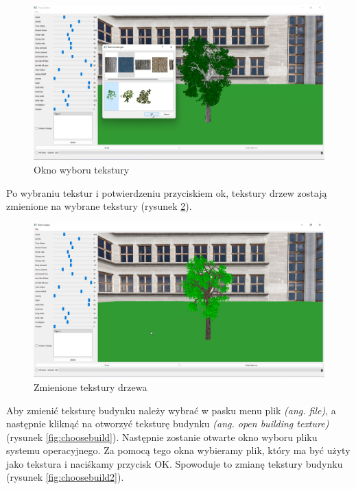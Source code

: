 \documentclass[a4paper,twoside,12pt]{report}
\begin{document}
\begin{figure}[H]
	\centering\includegraphics[width=15.5cm]{grafika/program/texture2.png}
	\caption{Okno wyboru tekstury}
    \label{fig:texchoosewin}
\end{figure}

Po wybraniu tekstur i potwierdzeniu przyciskiem ok, 
tekstury drzew zostają zmienione na wybrane 
tekstury (rysunek \ref{fig:texchoosewin2}).

\begin{figure}[H]
	\centering\includegraphics[width=15.5cm]{grafika/program/texture3.png}
	\caption{Zmienione tekstury drzewa}
    \label{fig:texchoosewin2}
\end{figure}

Aby zmienić teksturę budynku należy wybrać w pasku menu plik 
\textit{(ang. file)}, a następnie kliknąć na otworzyć 
teksturę budynku \textit{(ang. open building texture)} (rysunek \ref{fig:choosebuild}).
Następnie zostanie otwarte okno wyboru pliku systemu operacyjnego. 
Za pomocą tego okna wybieramy plik, który ma być użyty 
jako tekstura i naciśkamy przycisk OK. 
Spowoduje to zmianę tekstury budynku (rysunek \ref{fig:choosebuild2}).
\end{document}

